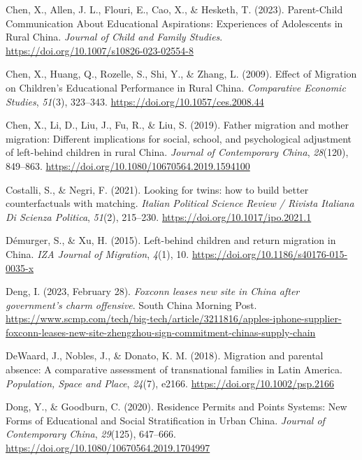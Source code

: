 \documentclass[
  man,floatsintext]{apa7}
\newlength{\cslhangindent}
\newlength{\cslentryspacingunit} %
\newenvironment{CSLReferences}[2] %
 {%
  \setlength{\parindent}{0pt}
  \ifodd #1
  \let\oldpar\par
  \def\par{\hangindent=\cslhangindent\oldpar}
  \fi
  \setlength{\parskip}{#2\cslentryspacingunit}
 }%
 {}
\begin{document}
\begin{CSLReferences}{1}{0}
\leavevmode{}%
Chen, X., Allen, J. L., Flouri, E., Cao, X., \& Hesketh, T. (2023). Parent-Child Communication About Educational Aspirations: Experiences of Adolescents in Rural {China}. \emph{Journal of Child and Family Studies}. \url{https://doi.org/10.1007/s10826-023-02554-8}

\leavevmode{}%
Chen, X., Huang, Q., Rozelle, S., Shi, Y., \& Zhang, L. (2009). Effect of Migration on Children's Educational Performance in Rural {China}. \emph{Comparative Economic Studies}, \emph{51}(3), 323--343. \url{https://doi.org/10.1057/ces.2008.44}

\leavevmode{}%
Chen, X., Li, D., Liu, J., Fu, R., \& Liu, S. (2019). Father migration and mother migration: Different implications for social, school, and psychological adjustment of left-behind children in rural {China}. \emph{Journal of Contemporary {China}}, \emph{28}(120), 849--863. \url{https://doi.org/10.1080/10670564.2019.1594100}

\leavevmode{}%
Costalli, S., \& Negri, F. (2021). Looking for twins: how to build better counterfactuals with matching. \emph{Italian Political Science Review / Rivista Italiana Di Scienza Politica}, \emph{51}(2), 215--230. \url{https://doi.org/10.1017/ipo.2021.1}

\leavevmode{}%
Démurger, S., \& Xu, H. (2015). Left-behind children and return migration in {China}. \emph{IZA Journal of Migration}, \emph{4}(1), 10. \url{https://doi.org/10.1186/s40176-015-0035-x}

\leavevmode{}%
Deng, I. (2023, February 28). \emph{Foxconn leases new site in China after government{'}s charm offensive}. South China Morning Post. \url{https://www.scmp.com/tech/big-tech/article/3211816/apples-iphone-supplier-foxconn-leases-new-site-zhengzhou-sign-commitment-chinas-supply-chain}

\leavevmode{}%
DeWaard, J., Nobles, J., \& Donato, K. M. (2018). Migration and parental absence: A comparative assessment of transnational families in Latin America. \emph{Population, Space and Place}, \emph{24}(7), e2166. \url{https://doi.org/10.1002/psp.2166}

\leavevmode{}%
Dong, Y., \& Goodburn, C. (2020). Residence Permits and Points Systems: New Forms of Educational and Social Stratification in Urban {China}. \emph{Journal of Contemporary {China}}, \emph{29}(125), 647--666. \url{https://doi.org/10.1080/10670564.2019.1704997}


\end{CSLReferences}
\end{document}

